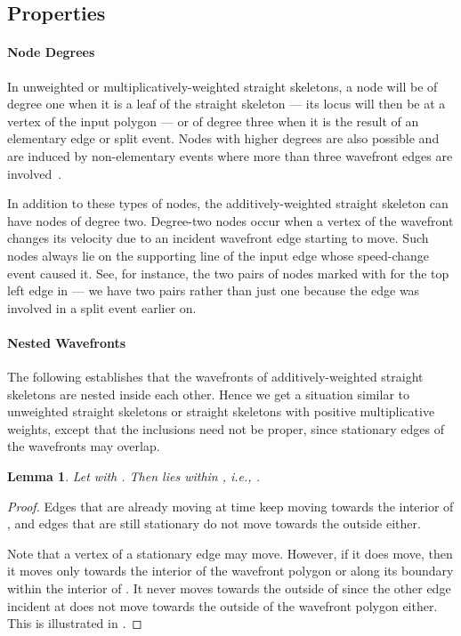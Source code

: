 \documentclass[preprint]{elsarticle}
\newtheorem{lemma}{Lemma}
\begin{document}
\subsection{Properties}

\paragraph{Node Degrees}

In unweighted or multiplicatively-weighted straight skeletons, a node
will be of degree one when it is a leaf of the straight skeleton --- its
locus will then be at a vertex of the input polygon --- or of degree three
when it is the result of an elementary edge or split event.  Nodes with higher
degrees are also possible and are induced by non-elementary events where
more than three wavefront edges are involved~\cite{BieHP14b}.

In addition to these types of nodes, the additively-weighted straight skeleton
can have nodes of degree two. Degree-two nodes occur when a vertex of the
wavefront changes its velocity due to an incident wavefront edge starting to
move.  Such nodes always lie on the supporting line of the input edge whose
speed-change event caused it. See, for instance, the two pairs of nodes marked
with  for the top left edge in  --- we have two
pairs rather than just one because the edge was involved in a split event
earlier on.

\paragraph{Nested Wavefronts}

The following  establishes that the wavefronts
of additively-weighted straight skeletons are nested inside each other. Hence
we get a situation similar to unweighted straight skeletons or straight
skeletons with positive multiplicative weights, except that the inclusions need not be proper,
since stationary edges of the wavefronts may overlap.

\begin{lemma}
  \label{lem:nesteded_wavefronts}
  Let  with . Then  lies
  within , i.e.,
  .
\end{lemma}
\begin{proof}
  Edges that are already moving at time  keep moving towards the interior
  of , and edges that are still stationary do not move
  towards the outside either.

  Note that a vertex  of a stationary edge  may move.  However, if it
  does move, then it moves only towards the interior of the wavefront polygon
   or along its boundary within the interior of .  It
  never moves towards the outside of  since the other
  edge incident at  does not move towards the outside of the wavefront
  polygon either.  This is illustrated in .
\end{proof}
\end{document}
